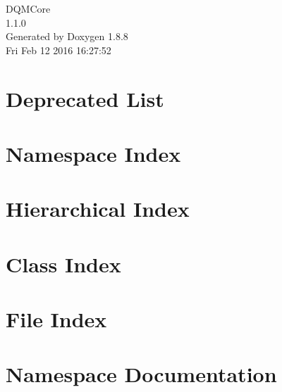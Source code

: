 \documentclass[twoside]{book}
\newcommand{\+}{\discretionary{\mbox{\scriptsize$\hookleftarrow$}}{}{}}
\newcommand{\clearemptydoublepage}{%
  \newpage{\pagestyle{empty}\cleardoublepage}%
}
\begin{document}
\begin{titlepage}
\vspace*{7cm}
\begin{center}%
{\Large D\+Q\+M\+Core \\[1ex]\large 1.\+1.\+0 }\\
\vspace*{1cm}
{\large Generated by Doxygen 1.8.8}\\
\vspace*{0.5cm}
{\small Fri Feb 12 2016 16:27:52}\\
\end{center}
\end{titlepage}
\clearemptydoublepage
\tableofcontents
\clearemptydoublepage
{}

\chapter{Deprecated List}
\label{deprecated}

\chapter{Namespace Index}

\chapter{Hierarchical Index}

\chapter{Class Index}

\chapter{File Index}

\chapter{Namespace Documentation}




\end{document}
